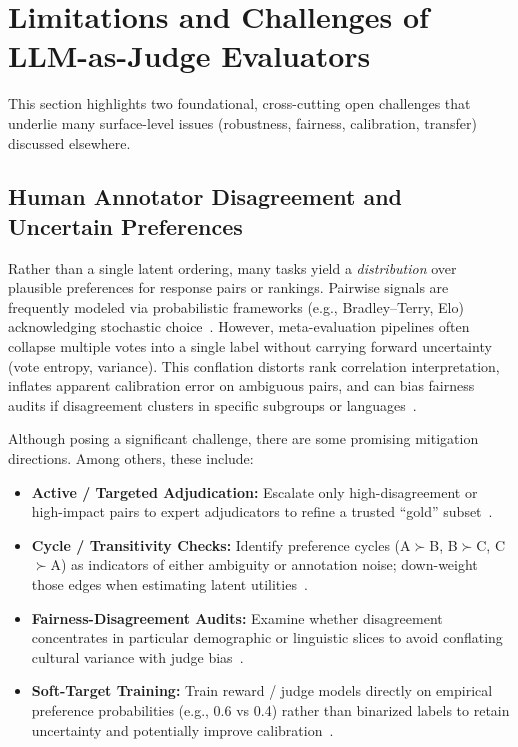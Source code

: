 
\section{Limitations and Challenges of LLM-as-Judge Evaluators}
This section highlights two foundational, cross-cutting open challenges that underlie many surface-level issues (robustness, fairness, calibration, transfer) discussed elsewhere.

\subsection{Human Annotator Disagreement and Uncertain Preferences}
Rather than a single latent ordering, many tasks yield a \emph{distribution} over plausible preferences for response pairs or rankings. Pairwise signals are frequently modeled via probabilistic frameworks (e.g., Bradley--Terry, Elo) acknowledging stochastic choice~\cite{bradley1952rank, elo1978rating, liu2024pairs}. However, meta-evaluation pipelines often collapse multiple votes into a single label without carrying forward uncertainty (vote entropy, variance). This conflation distorts rank correlation interpretation, inflates apparent calibration error on ambiguous pairs, and can bias fairness audits if disagreement clusters in specific subgroups or languages~\cite{hada2024metal, liang2022helm}.

Although posing a significant challenge, there are some promising mitigation directions. Among others, these include:
\begin{itemize}
	\item \textbf{Active / Targeted Adjudication:} Escalate only high-disagreement or high-impact pairs to expert adjudicators to refine a trusted ``gold'' subset~\cite{stiennon2020learning, ouyang2022training}.
	\item \textbf{Cycle / Transitivity Checks:} Identify preference cycles (A$\succ$B, B$\succ$C, C$\succ$A) as indicators of either ambiguity or annotation noise; down-weight those edges when estimating latent utilities~\cite{bradley1952rank, liu2024pairs}.
	\item \textbf{Fairness-Disagreement Audits:} Examine whether disagreement concentrates in particular demographic or linguistic slices to avoid conflating cultural variance with judge bias~\cite{hada2024metal, liang2022helm}.
	\item \textbf{Soft-Target Training:} Train reward / judge models directly on empirical preference probabilities (e.g., 0.6 vs 0.4) rather than binarized labels to retain uncertainty and potentially improve calibration~\cite{stiennon2020learning, ouyang2022training}.
\end{itemize}

